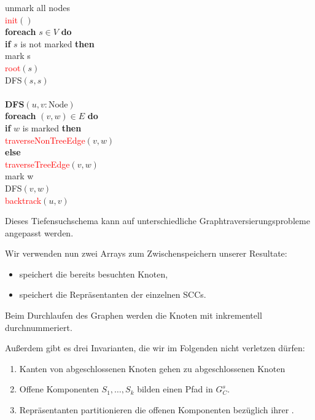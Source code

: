 \begin{pseudocode}
  unmark all nodes \\
  \textcolor{red}{init}\( () \) \\
  \textbf{foreach} \( s \in V \) \textbf{do} \\
  \phantom{\enskip} \textbf{if} \( s \) is not marked \textbf{then} \\
  \phantom{\enskip} \phantom{\enskip} mark s \\
  \phantom{\enskip} \phantom{\enskip} \textcolor{red}{root}\( (s) \) \\
  \phantom{\enskip} \phantom{\enskip} DFS\( (s,s) \) \\
  \ \\
  \textbf{\textsc{DFS}}\( (u,v : \text{Node}) \) \\
  \phantom{\enskip} \textbf{foreach} \( (v,w) \in E \) \textbf{do} \\
  \phantom{\enskip} \phantom{\enskip} \textbf{if} \( w \) is marked \textbf{then} \\ \phantom{\enskip} \phantom{\enskip} \phantom{\enskip} \textcolor{red}{traverseNonTreeEdge}\( (v,w) \) \\
  \phantom{\enskip} \phantom{\enskip} \textbf{else} \\
  \phantom{\enskip} \phantom{\enskip} \phantom{\enskip} \textcolor{red}{traverseTreeEdge}\( (v,w) \) \\
  \phantom{\enskip} \phantom{\enskip} \phantom{\enskip} mark w \\
  \phantom{\enskip} \phantom{\enskip} \phantom{\enskip} DFS\( (v,w) \) \\
  \phantom{\enskip} \textcolor{red}{backtrack}\( (u,v) \)
\end{pseudocode}

Dieses Tiefensuchschema kann auf unterschiedliche Graphtraversierungsprobleme angepasst werden.

Wir verwenden nun zwei Arrays zum Zwischenspeichern unserer Resultate:
\begin{itemize}
  \item {} speichert die bereits besuchten Knoten,
  \item {} speichert die Repräsentanten der einzelnen SCCs.
\end{itemize}

Beim Durchlaufen des Graphen werden die Knoten mit  inkrementell durchnummeriert.

Außerdem gibt es drei Invarianten, die wir im Folgenden nicht verletzen dürfen:
\begin{enumerate}
  \item Kanten von abgeschlossenen Knoten gehen zu abgeschlossenen Knoten
  \item Offene Komponenten \( S_1,\dots,S_k \) bilden einen Pfad in \( G_C^s \).
  \item Repräsentanten partitionieren die offenen Komponenten bezüglich ihrer .
\end{enumerate}

